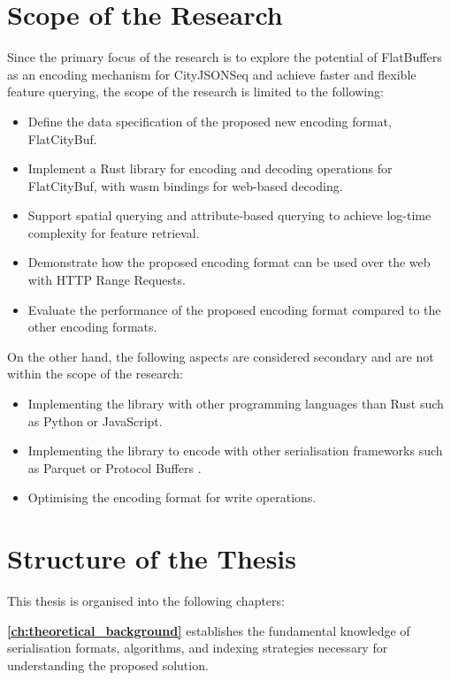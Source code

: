 \section{Scope of the Research}
\label{introduction:scope_of_the_research}

Since the primary focus of the research is to explore the potential of FlatBuffers as an encoding mechanism for CityJSONSeq and achieve faster and flexible feature querying, the scope of the research is limited to the following:

\begin{itemize}
  \item Define the data specification of the proposed new encoding format, FlatCityBuf.
  \item Implement a Rust library for encoding and decoding operations for FlatCityBuf, with \ac{wasm} bindings for web-based decoding.
  \item Support spatial querying and attribute-based querying to achieve log-time complexity for feature retrieval.
  \item Demonstrate how the proposed encoding format can be used over the web with HTTP Range Requests.
  \item Evaluate the performance of the proposed encoding format compared to the other encoding formats.
\end{itemize}

On the other hand, the following aspects are considered secondary and are not within the scope of the research:
\begin{itemize}
  \item Implementing the library with other programming languages than Rust such as Python or JavaScript.
  \item Implementing the library to encode with other serialisation frameworks such as Parquet \citep{parquet} or Protocol Buffers \citep{protobuf}.
  \item Optimising the encoding format for write operations.
\end{itemize}

\section{Structure of the Thesis}
\label{introduction:structure_of_the_thesis}

This thesis is organised into the following chapters:

\textbf{\autoref{ch:theoretical_background}} establishes the fundamental knowledge of serialisation formats, algorithms, and indexing strategies necessary for understanding the proposed solution.

